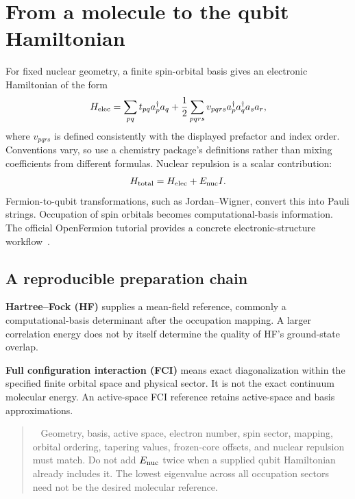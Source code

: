 \documentclass[11pt,a4paper]{article}
\newcommand{\lesson}[2]{\clearpage\section{#1}\label{#2}}
\newenvironment{caution}[1][Important distinction]{\par\smallskip\begin{quotation}\noindent{\bfseries\textcolor{alertred}{#1.}}\ }{\end{quotation}\smallskip}
\begin{document}
\lesson{From a molecule to the qubit Hamiltonian}{sec:molecules}
For fixed nuclear geometry, a finite spin-orbital basis gives an electronic Hamiltonian of the form
\[
H_{\rm elec}=\sum_{pq}t_{pq}a_p^\dagger a_q
+\frac12\sum_{pqrs}v_{pqrs}a_p^\dagger a_q^\dagger a_s a_r,
\]
where $v_{pqrs}$ is defined consistently with the displayed prefactor and index order. Conventions vary, so use a chemistry package's definitions rather than mixing coefficients from different formulas. Nuclear repulsion is a scalar contribution:
\[
H_{\rm total}=H_{\rm elec}+E_{\rm nuc}I.
\]
Fermion-to-qubit transformations, such as Jordan--Wigner, convert this into Pauli strings. Occupation of spin orbitals becomes computational-basis information. The official OpenFermion tutorial provides a concrete electronic-structure workflow~\cite{openfermion}.

\subsection*{A reproducible preparation chain}
\begin{center}
\end{center}

\textbf{Hartree--Fock (HF)} supplies a mean-field reference, commonly a computational-basis determinant after the occupation mapping. A larger correlation energy does not by itself determine the quality of HF's ground-state overlap.

\textbf{Full configuration interaction (FCI)} means exact diagonalization within the specified finite orbital space and physical sector. It is not the exact continuum molecular energy. An active-space FCI reference retains active-space and basis approximations.

\begin{caution}[Never compare different energy conventions]
Geometry, basis, active space, electron number, spin sector, mapping, orbital ordering, tapering values, frozen-core offsets, and nuclear repulsion must match. Do not add $E_{\rm nuc}$ twice when a supplied qubit Hamiltonian already includes it. The lowest eigenvalue across all occupation sectors need not be the desired molecular reference.
\end{caution}
\end{document}
